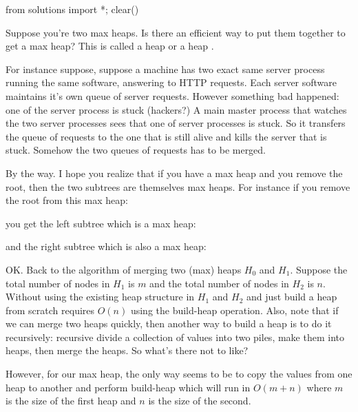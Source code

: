 \begin{python0}
from solutions import *; clear()
\end{python0}

Suppose you're two max heaps.
Is there an efficient way to put them together to get a max heap?
This is called a heap  or a heap .

For instance suppose, suppose a machine has
two exact same server process running the same software,
answering to HTTP requests.
Each server software maintains it's own queue of server requests.
However something bad happened: one of the server process is stuck
(hackers?)
A main master process that watches the two server processes
sees that one of server processes is stuck.
So it transfers the queue of requests to the one that is still alive
and kills the server that is stuck.
Somehow the two queues of requests has to be merged.

By the way.
I hope you realize that if you have a max heap and you remove the
root, then the two subtrees are themselves max heaps.
For instance if you remove the root from this max heap:



you get the left subtree which is a max heap:



and the right subtree which is also a max heap:



OK.
Back to the algorithm of merging two (max) heaps $H_0$ and $H_1$.
Suppose the total number of nodes in $H_1$ is $m$
and the total number of nodes in $H_2$ is $n$.
Without using the existing heap structure in $H_1$ and $H_2$
and just build a heap from scratch requires $O(n)$ using the build-heap
operation.
Also, note that if we can merge two heaps quickly,
then another way to build a heap is to do it recursively:
recursive divide a collection of values into two piles,
make them into heaps, then merge the heaps.
So what's there not to like?

However, for our max heap, the only way seems to be to copy the
values from one heap to another and perform build-heap
which will run in $O(m + n)$
where $m$ is the size of the first heap and $n$ is the size of the second.




